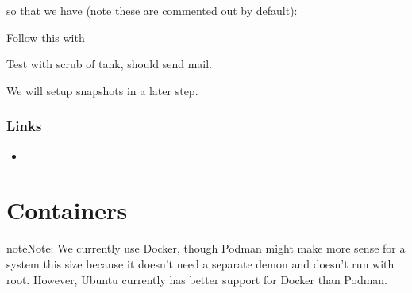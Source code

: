 \documentclass[a4paper,10pt,english]{sphinxmanual}
\begin{document}
so that we have (note these are commented out by default):

\begin{sphinxVerbatim}[commandchars=\\\{\}]
\end{sphinxVerbatim}

Follow this with

\begin{sphinxVerbatim}[commandchars=\\\{\}]
   
\end{sphinxVerbatim}

Test with scrub of tank, should send mail.

\begin{sphinxVerbatim}[commandchars=\\\{\}]
   
\end{sphinxVerbatim}

We will setup snapshots in a later step.


\subsection{Links}
\label{\detokenize{zfs:links}}\begin{itemize}
\item {} 

\end{itemize}


\chapter{Containers}
\label{\detokenize{containers:containers}}\label{\detokenize{containers::doc}}
\begin{sphinxadmonition}{note}{Note:}
We currently use Docker, though Podman might make more sense for a
system this size because it doesn’t need a separate demon and doesn’t
run with root. However, Ubuntu currently has better support for Docker
than Podman.
\end{sphinxadmonition}
\end{document}
